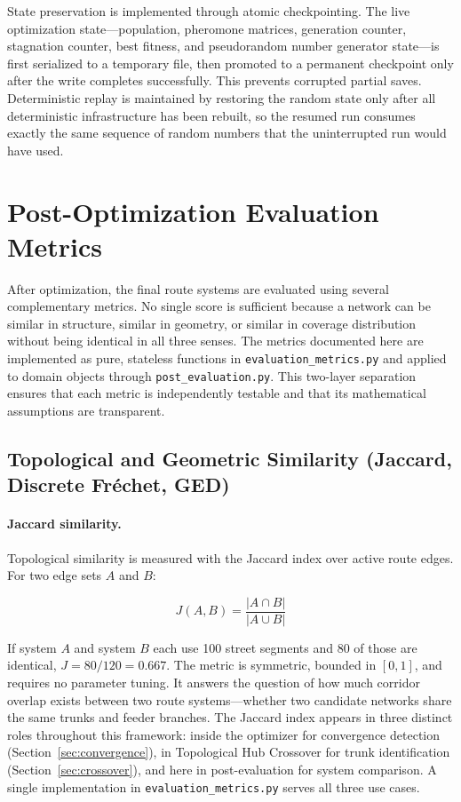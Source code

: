 {{State preservation is implemented through atomic checkpointing. The live optimization state—population, pheromone matrices, generation counter, stagnation counter, best fitness, and pseudorandom number generator state—is first serialized to a temporary file, then promoted to a permanent checkpoint only after the write completes successfully. This prevents corrupted partial saves. Deterministic replay is maintained by restoring the random state only after all deterministic infrastructure has been rebuilt, so the resumed run consumes exactly the same sequence of random numbers that the uninterrupted run would have used.

\section{Post-Optimization Evaluation Metrics}
\label{sec:metrics}
\noindent
After optimization, the final route systems are evaluated using several complementary metrics. No single score is sufficient because a network can be similar in structure, similar in geometry, or similar in coverage distribution without being identical in all three senses. The metrics documented here are implemented as pure, stateless functions in \texttt{evaluation\_metrics.py} and applied to domain objects through \texttt{post\_evaluation.py}. This two-layer separation ensures that each metric is independently testable and that its mathematical assumptions are transparent.

\subsection{Topological and Geometric Similarity (Jaccard, Discrete Fréchet, GED)}
\label{sec:topo_metrics}
\noindent

\paragraph{Jaccard similarity.}
Topological similarity is measured with the Jaccard index over active route edges. For two edge sets $A$ and $B$:

\[
J(A,B) = \frac{|A \cap B|}{|A \cup B|}
\]

If system $A$ and system $B$ each use 100 street segments and 80 of those are identical, $J = 80/120 = 0.667$. The metric is symmetric, bounded in $[0,1]$, and requires no parameter tuning. It answers the question of how much corridor overlap exists between two route systems—whether two candidate networks share the same trunks and feeder branches. The Jaccard index appears in three distinct roles throughout this framework: inside the optimizer for convergence detection (Section~\ref{sec:convergence}), in Topological Hub Crossover for trunk identification (Section~\ref{sec:crossover}), and here in post-evaluation for system comparison. A single implementation in \texttt{evaluation\_metrics.py} serves all three use cases.

}}
